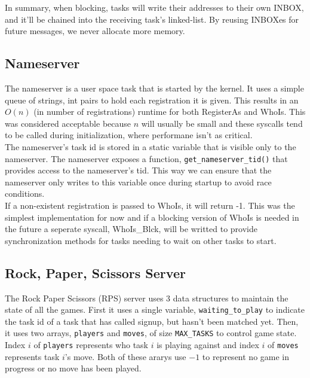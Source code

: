 \documentclass[letterpaper]{article}
\begin{document}
In summary, when blocking, tasks will write their addresses to their own INBOX, and it'll be chained into the receiving task's linked-list. By reusing INBOXes for future messages, we never allocate more memory.

\subsection{Nameserver}

The nameserver is a user space task that is started by the kernel. It uses a simple queue of strings, int pairs to hold each registration it is given. This results in an $O(n)$ (in number of registrations) runtime for both RegisterAs and WhoIs. This was considered acceptable because $n$ will usually be small and these syscalls tend to be called during initialization, where performane isn't as critical. \\

The nameserver's task id is stored in a static variable that is visible only to the nameserver. The nameserver exposes a function, {\tt get\_nameserver\_tid()} that provides access to the nameserver's tid. This way we can ensure that the nameserver only writes to this variable once during startup to avoid race conditions. \\

If a non-existent registration is passed to WhoIs, it will return -1. This was the simplest implementation for now and if a blocking version of WhoIs is needed in the future a seperate syscall, WhoIs\_Blck, will be writted to provide synchronization methods for tasks needing to wait on other tasks to start. 

\subsection{Rock, Paper, Scissors Server}

The Rock Paper Scissors (RPS) server uses 3 data structures to maintain the state of all the games. First it uses a single variable, {\tt waiting\_to\_play} to indicate the task id of a task that has called signup, but hasn't been matched yet. Then, it uses two arrays, {\tt players} and {\tt moves}, of size {\tt MAX\_TASKS} to control game state. Index $i$ of {\tt players} represents who task $i$ is playing against and index $i$ of {\tt moves} represents task $i$'s move. Both of these ararys use $-1$ to represent no game in progress or no move has been played. \\
\end{document}
